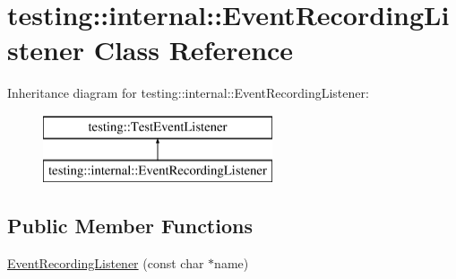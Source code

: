 \hypertarget{classtesting_1_1internal_1_1_event_recording_listener}{}\section{testing\+:\+:internal\+:\+:Event\+Recording\+Listener Class Reference}
\label{classtesting_1_1internal_1_1_event_recording_listener}
Inheritance diagram for testing\+:\+:internal\+:\+:Event\+Recording\+Listener\+:\begin{figure}[H]
\begin{center}
\leavevmode
\includegraphics[height=2.000000cm]{classtesting_1_1internal_1_1_event_recording_listener}
\end{center}
\end{figure}
\subsection*{Public Member Functions}
\begin{DoxyCompactItemize}
\item 
\hyperlink{classtesting_1_1internal_1_1_event_recording_listener_a7b0254c15d6b8468e1441ee572fee707}{Event\+Recording\+Listener} (const char $\ast$name)
\end{DoxyCompactItemize}
